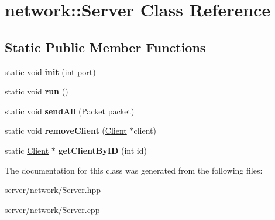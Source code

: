 \hypertarget{classnetwork_1_1_server}{\section{network\-:\-:Server Class Reference}
\label{classnetwork_1_1_server}
}
\subsection*{Static Public Member Functions}
\begin{DoxyCompactItemize}
\item 
\hypertarget{classnetwork_1_1_server_a92b4aa8269a4030295539d74aba58de5}{static void {\bfseries init} (int port)}\label{classnetwork_1_1_server_a92b4aa8269a4030295539d74aba58de5}

\item 
\hypertarget{classnetwork_1_1_server_a2ca5bc82a53d4115be393b7b8943824d}{static void {\bfseries run} ()}\label{classnetwork_1_1_server_a2ca5bc82a53d4115be393b7b8943824d}

\item 
\hypertarget{classnetwork_1_1_server_a46db9e3e080162fde379b7132c1c4b9e}{static void {\bfseries send\-All} (Packet packet)}\label{classnetwork_1_1_server_a46db9e3e080162fde379b7132c1c4b9e}

\item 
\hypertarget{classnetwork_1_1_server_a80e4142ac7c8ee7dfec180c57ec0d540}{static void {\bfseries remove\-Client} (\hyperlink{class_client}{Client} $\ast$client)}\label{classnetwork_1_1_server_a80e4142ac7c8ee7dfec180c57ec0d540}

\item 
\hypertarget{classnetwork_1_1_server_a921a1406b2703c03a5f06ad705bcd37b}{static \hyperlink{class_client}{Client} $\ast$ {\bfseries get\-Client\-By\-I\-D} (int id)}\label{classnetwork_1_1_server_a921a1406b2703c03a5f06ad705bcd37b}

\end{DoxyCompactItemize}


The documentation for this class was generated from the following files\-:\begin{DoxyCompactItemize}
\item 
server/network/Server.\-hpp\item 
server/network/Server.\-cpp\end{DoxyCompactItemize}
